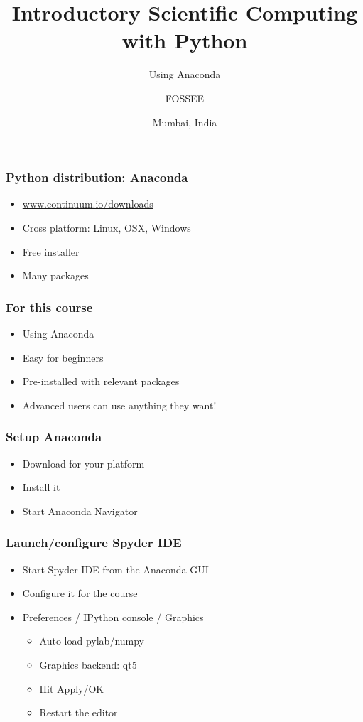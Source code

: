 \documentclass[14pt,compress]{beamer}
\title[Preliminaries]{Introductory Scientific Computing with
Python}
\subtitle{Using Anaconda}
\author[FOSSEE] {FOSSEE}
\institute[IIT Bombay] {Department of Aerospace Engineering\\IIT Bombay}
\date[] {Mumbai, India
}
\begin{document}
\begin{frame}
  \maketitle
\end{frame}

\begin{frame}
  \frametitle{Python distribution: Anaconda}
  \begin{itemize}
  \item \url{www.continuum.io/downloads}
  \item Cross platform: Linux, OSX, Windows
  \item Free installer
  \item Many packages
  \end{itemize}
\end{frame}

\begin{frame}[plain]
  \frametitle{For this course}
  \begin{itemize}
  \item Using Anaconda
  \item Easy for beginners
  \item Pre-installed with relevant packages
    \vspace*{0.25in}
  \item Advanced users can use anything they want!
  \end{itemize}
\end{frame}

\begin{frame}[plain]
  \frametitle{Setup Anaconda}
  \begin{itemize}
    \item Download for your platform
    \item Install it
    \item Start Anaconda Navigator
  \end{itemize}
\end{frame}

\begin{frame}[plain]
  \frametitle{Launch/configure Spyder IDE}
  \begin{itemize}
  \item Start Spyder IDE from the Anaconda GUI
  \item Configure it for the course
  \item Preferences / IPython console / Graphics
    \begin{itemize}
    \item Auto-load pylab/numpy
    \item Graphics backend: qt5
    \item Hit Apply/OK
    \item Restart the editor
    \end{itemize}
  \end{itemize}
\end{frame}
\end{document}
